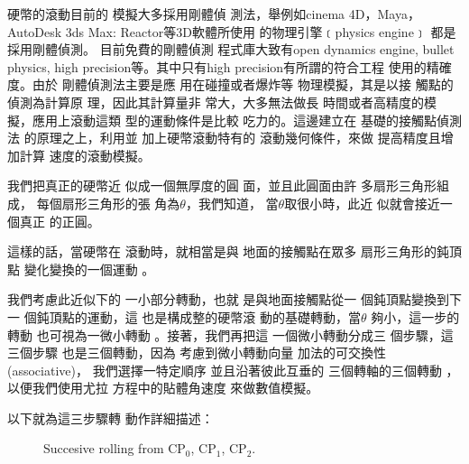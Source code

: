 \documentclass[12pt,twoside]{article}
\begin{document}
\bigskip  

\bigskip 硬幣的滾動目前的%
模擬大多採用剛體偵%
測法，舉例如cinema 4D，Maya，%
AutoDesk 3ds Max: Reactor等3D軟體所使用%
的物理引擎﹝physics engine﹞%
都是採用剛體偵測。%
目前免費的剛體偵測%
程式庫大致有open dynamics engine, bullet
physics, high precision等。其中只有high
precision有所謂的符合工程%
使用的精確度。由於%
剛體偵測法主要是應%
用在碰撞或者爆炸等%
物理模擬，其是以接%
觸點的偵測為計算原%
理，因此其計算量非%
常大，大多無法做長%
時間或者高精度的模%
擬，應用上滾動這類%
型的運動條件是比較%
吃力的。這邊建立在%
基礎的接觸點偵測法%
的原理之上，利用並%
加上硬幣滾動特有的%
滾動幾何條件，來做%
提高精度且增加計算%
速度的滾動模擬。

我們把真正的硬幣近%
似成一個無厚度的圓%
面，並且此圓面由許%
多扇形三角形組成，%
每個扇形三角形的張%
角為$\theta $，我們知道，%
當$\theta $取很小時，此近%
似就會接近一個真正%
的正圓。

這樣的話，當硬幣在%
滾動時，就相當是與%
地面的接觸點在眾多%
扇形三角形的鈍頂點%
變化變換的一個運動%
。

我們考慮此近似下的%
一小部分轉動，也就%
是與地面接觸點從一%
個鈍頂點變換到下一%
個鈍頂點的運動，這%
也是構成整的硬幣滾%
動的基礎轉動，當$\theta $%
夠小，這一步的轉動%
也可視為一微小轉動%
。接著，我們再把這%
一個微小轉動分成三%
個步驟，這三個步驟%
也是三個轉動，因為%
考慮到微小轉動向量%
加法的可交換性(associative)，%
我們選擇一特定順序%
並且沿著彼此互垂的%
三個轉軸的三個轉動%
，以便我們使用尤拉%
方程中的貼體角速度%
來做數值模擬。

以下就為這三步驟轉%
動作詳細描述：

\begin{figure}[th]
\caption{{}}
\label{figure1}
\begin{center}
\fbox{}
\end{center}
\end{figure}

\begin{figure}[th]
\caption{{}Succesive rolling from CP$_{0}$, CP$_{1}$, CP$_{2}$.}
\begin{center}
\fbox{}
\end{center}
\end{figure}
\end{document}
